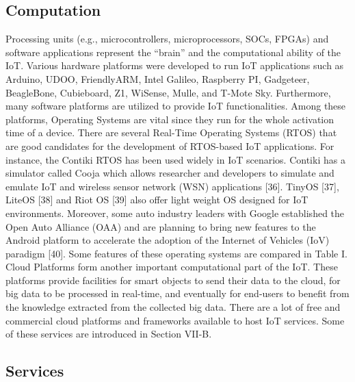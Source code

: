 \subsection{Computation}

Processing units (e.g., microcontrollers, microprocessors,
SOCs, FPGAs) and software applications represent the “brain”
and the computational ability of the IoT. Various hardware platforms
were developed to run IoT applications such as Arduino,
UDOO, FriendlyARM, Intel Galileo, Raspberry PI, Gadgeteer,
BeagleBone, Cubieboard, Z1, WiSense, Mulle, and T-Mote Sky.
Furthermore, many software platforms are utilized to provide
IoT functionalities. Among these platforms, Operating Systems
are vital since they run for the whole activation time of a
device. There are several Real-Time Operating Systems (RTOS)
that are good candidates for the development of RTOS-based IoT
applications. For instance, the Contiki RTOS has been used
widely in IoT scenarios. Contiki has a simulator called Cooja
which allows researcher and developers to simulate and emulate
IoT and wireless sensor network (WSN) applications [36].
TinyOS [37], LiteOS [38] and Riot OS [39] also offer light
weight OS designed for IoT environments. Moreover, some
auto industry leaders with Google established the Open Auto
Alliance (OAA) and are planning to bring new features to the
Android platform to accelerate the adoption of the Internet of
Vehicles (IoV) paradigm [40]. Some features of these operating
systems are compared in Table I.
Cloud Platforms form another important computational part
of the IoT. These platforms provide facilities for smart objects
to send their data to the cloud, for big data to be processed
in real-time, and eventually for end-users to benefit from the
knowledge extracted from the collected big data. There are a
lot of free and commercial cloud platforms and frameworks
available to host IoT services. Some of these services are
introduced in Section VII-B.

\subsection{Services}

